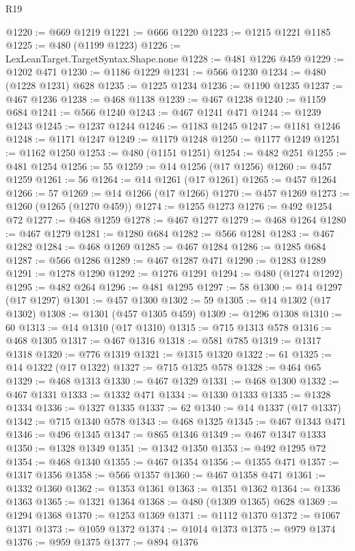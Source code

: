 \begin{lexlean}{R19}
\begin{coremodule}
@1220 := @669 @1219
@1221 := @666 @1220
@1223 := @1215 @1221 @1185
@1225 := @480 (@1199 @1223)
@1226 := LexLeanTarget.TargetSyntax.Shape.none
@1228 := @481 @1226 @459
@1229 := @1202 @471
@1230 := @1186 @1229
@1231 := @566 @1230
@1234 := @480 (@1228 @1231) @628
@1235 := @1225 @1234
@1236 := @1190 @1235
@1237 := @467 @1236
@1238 := @468 @1138
@1239 := @467 @1238
@1240 := @1159 @684
@1241 := @566 @1240
@1243 := @467 @1241 @471
@1244 := @1239 @1243
@1245 := @1237 @1244
@1246 := @1183 @1245
@1247 := @1181 @1246
@1248 := @1171 @1247
@1249 := @1179 @1248
@1250 := @1177 @1249
@1251 := @1162 @1250
@1253 := @480 (@1151 @1251)
@1254 := @482 @251
@1255 := @481 @1254
@1256 := 55
@1259 := @14 @1256 (@17 @1256)
@1260 := @457 @1259
@1261 := 56
@1264 := @14 @1261 (@17 @1261)
@1265 := @457 @1264
@1266 := 57
@1269 := @14 @1266 (@17 @1266)
@1270 := @457 @1269
@1273 := @1260 (@1265 (@1270 @459))
@1274 := @1255 @1273
@1276 := @492 @1254 @72
@1277 := @468 @1259
@1278 := @467 @1277
@1279 := @468 @1264
@1280 := @467 @1279
@1281 := @1280 @684
@1282 := @566 @1281
@1283 := @467 @1282
@1284 := @468 @1269
@1285 := @467 @1284
@1286 := @1285 @684
@1287 := @566 @1286
@1289 := @467 @1287 @471
@1290 := @1283 @1289
@1291 := @1278 @1290
@1292 := @1276 @1291
@1294 := @480 (@1274 @1292)
@1295 := @482 @264
@1296 := @481 @1295
@1297 := 58
@1300 := @14 @1297 (@17 @1297)
@1301 := @457 @1300
@1302 := 59
@1305 := @14 @1302 (@17 @1302)
@1308 := @1301 (@457 @1305 @459)
@1309 := @1296 @1308
@1310 := 60
@1313 := @14 @1310 (@17 @1310)
@1315 := @715 @1313 @578
@1316 := @468 @1305
@1317 := @467 @1316
@1318 := @581 @785
@1319 := @1317 @1318
@1320 := @776 @1319
@1321 := @1315 @1320
@1322 := 61
@1325 := @14 @1322 (@17 @1322)
@1327 := @715 @1325 @578
@1328 := @464 @65
@1329 := @468 @1313
@1330 := @467 @1329
@1331 := @468 @1300
@1332 := @467 @1331
@1333 := @1332 @471
@1334 := @1330 @1333
@1335 := @1328 @1334
@1336 := @1327 @1335
@1337 := 62
@1340 := @14 @1337 (@17 @1337)
@1342 := @715 @1340 @578
@1343 := @468 @1325
@1345 := @467 @1343 @471
@1346 := @496 @1345
@1347 := @865 @1346
@1349 := @467 @1347 @1333
@1350 := @1328 @1349
@1351 := @1342 @1350
@1353 := @492 @1295 @72
@1354 := @468 @1340
@1355 := @467 @1354
@1356 := @1355 @471
@1357 := @1317 @1356
@1358 := @566 @1357
@1360 := @467 @1358 @471
@1361 := @1332 @1360
@1362 := @1353 @1361
@1363 := @1351 @1362
@1364 := @1336 @1363
@1365 := @1321 @1364
@1368 := @480 (@1309 @1365) @628
@1369 := @1294 @1368
@1370 := @1253 @1369
@1371 := @1112 @1370
@1372 := @1067 @1371
@1373 := @1059 @1372
@1374 := @1014 @1373
@1375 := @979 @1374
@1376 := @959 @1375
@1377 := @894 @1376

\end{coremodule}
\end{lexlean}
